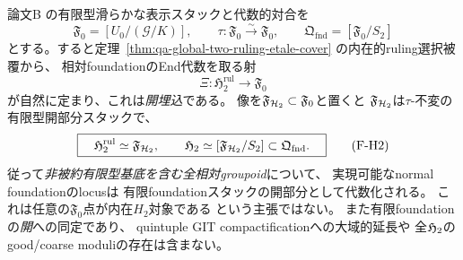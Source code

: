 \begin{theorem}
\label{thm:qa-intrinsic-h2-open-in-foundation-stack}
論文B
\cite[\texttt{prop:foundation-stack},
\texttt{prop:relative-ruling-involution}]{QuadricModuli2026}
の有限型滑らかな表示スタックと代数的対合を
\[
 \mathfrak F_0=[U_0/(\mathcal G/K)],\qquad
 \tau:\mathfrak F_0\xrightarrow{\sim}\mathfrak F_0,\qquad
 \mathfrak Q_{\mathrm{fnd}}=[\mathfrak F_0/S_2]
\]
とする。すると定理~\ref{thm:qa-global-two-ruling-etale-cover}
の内在的ruling選択被覆から、
相対foundationのEnd代数を取る射
\[
 \Xi:\mathfrak H_2^{\mathrm{rul}}
            \longrightarrow\mathfrak F_0
 \tag{F-open}\label{eq:qa-h2-foundation-open}
\]
が自然に定まり、これは\emph{開埋込}である。
像を$\mathfrak F_{\mathcal H_2}\subset\mathfrak F_0$と置くと
$\mathfrak F_{\mathcal H_2}$は$\tau$-不変の有限型開部分スタックで、
\[
 \boxed{\quad
   \mathfrak H_2^{\mathrm{rul}}
       \simeq\mathfrak F_{\mathcal H_2},\qquad
   \mathfrak H_2\simeq[\mathfrak F_{\mathcal H_2}/S_2]
   \subset\mathfrak Q_{\mathrm{fnd}}.\quad}
 \tag{F-H2}\label{eq:qa-full-intrinsic-foundation-open}
\]
従って\emph{非被約有限型基底を含む全相対groupoid}について、
実現可能なnormal foundationのlocusは
有限foundationスタックの開部分として代数化される。
これは任意の$\mathfrak F_0$点が内在$H_2$対象である
という主張ではない。
また有限foundationの\emph{開}への同定であり、
quintuple GIT compactificationへの大域的延長や
全$\mathfrak H_2$のgood/coarse moduliの存在は含まない。
\end{theorem}
